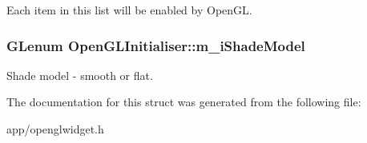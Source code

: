 Each item in this list will be enabled by Open\-G\-L. \hypertarget{struct_open_g_l_initialiser_ad2ad4d011d3d4a57faeae733fd065549}{
\subsubsection[{m\-\_\-i\-Shade\-Model}]{\setlength{\rightskip}{0pt plus 5cm}G\-Lenum Open\-G\-L\-Initialiser\-::m\-\_\-i\-Shade\-Model}}\label{struct_open_g_l_initialiser_ad2ad4d011d3d4a57faeae733fd065549}
Shade model -\/ smooth or flat. 

The documentation for this struct was generated from the following file\-:\begin{DoxyCompactItemize}
\item 
app/openglwidget.\-h\end{DoxyCompactItemize}
